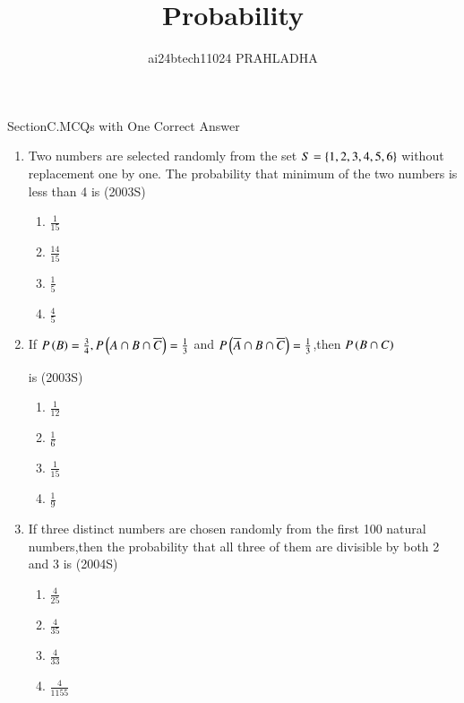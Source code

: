 \documentclass[journal,12pt,twocolumn]{IEEEtran}
\theoremstyle{remark}
\begin{document}

\vspace{3cm}
\title{Probability}
\author{ai24btech11024 PRAHLADHA%
}
\maketitle
\newpage
\bigskip
\renewcommand{\thefigure}{\theenumi}
\renewcommand{\thetable}{\theenumi}
\maketitle\Large{SectionC.MCQs with One Correct Answer}
\begin{enumerate}[start=16]\large
 
\item Two numbers are selected randomly from the set $S=\left\{1,2,3,4,5,6\right\}$ without replacement one by one. The probability that minimum of the two numbers is less than 4 is   \hfill (2003S)
\begin{multicols}{4}
\begin{enumerate}
    \item $\frac{1}{15}$
    \item $\frac{14}{15}$
    \item $\frac{1}{5}$
    \item $\frac{4}{5}$
\end{enumerate}
\end{multicols}
\item If $P\left(B\right)=\frac{3}{4},P\left(A\cap B \cap \overline{C}\right)=\frac{1}{3}$ and $P\left(\overline{A}\cap B\cap \overline{C}\right)=\frac{1}{3}$,then $P\left(B\cap C\right)$ 

is \hfill (2003S)
\begin{multicols}{4}
\begin{enumerate}
    \item $\frac{1}{12}$
    \item $\frac{1}{6}$
    \item $\frac{1}{15}$
    \item $\frac{1}{9}$
\end{enumerate}
    
\end{multicols}
\item If three distinct numbers are chosen randomly from the first 100 natural numbers,then the probability that all three of them are divisible by both 2 and 3 is \hfill  (2004S)
\begin{multicols}{4}
\begin{enumerate}
\item $\frac{4}{25}$
\item $\frac{4}{35}$
\item $\frac{4}{33}$
\item $\frac{4}{1155}$
\end{enumerate}
    

\end{multicols}
\end{enumerate}
\end{document}
